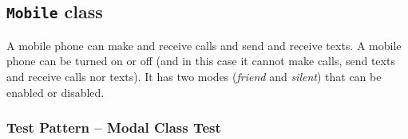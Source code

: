 %
%
%
\subsection{\texttt{Mobile} class}
\label{sec:classes.mobile}
A mobile phone can make and receive calls and send and receive texts. A mobile
phone can be turned on or off (and in this case it cannot make calls, send texts
and receive calls nor texts). It has two modes (\textit{friend} and
\textit{silent}) that can be enabled or disabled.

\subsubsection{Test Pattern -- Modal Class Test}
\label{sec:classes.mobile.pattern}

